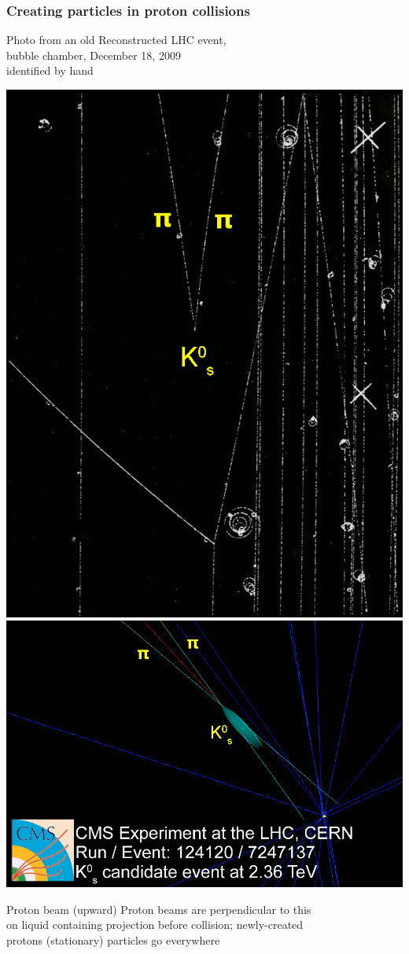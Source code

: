 \documentclass[compress]{beamer}
\begin{document}
\begin{frame}
\frametitle{Creating particles in proton collisions}

Photo from an old \hfill Reconstructed LHC event, \\
bubble chamber, \hfill December 18, 2009 \\
identified by hand

\vspace{0.2 cm}
\includegraphics[height=4.5 cm]{k0-to-pipi_bubblechamber.png} \hfill
\includegraphics[height=4.5 cm]{cms_kshort.png}

\vspace{0.2 cm}

Proton beam (upward) \hfill Proton beams are perpendicular to this \\
on liquid containing \hfill projection before collision; newly-created \\
protons (stationary) \hfill particles go everywhere
\end{frame}
\end{document}
